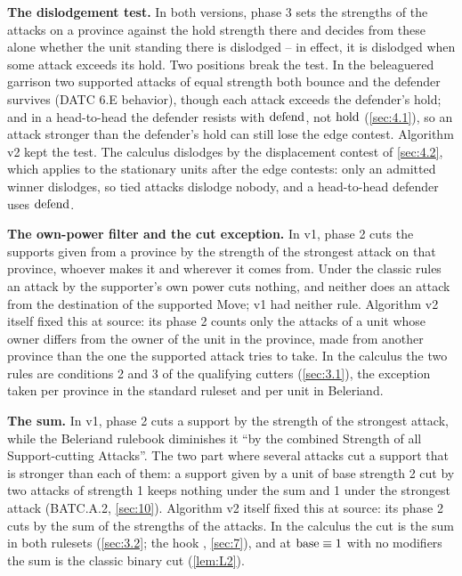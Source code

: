 \documentclass[12pt,a4paper]{article}
\begin{document}
 \textbf{The dislodgement test.}
In both versions, phase 3 sets the strengths of the attacks on a province against the hold strength there and decides from these alone whether the unit standing there is dislodged -- in effect, it is dislodged when some attack exceeds its hold.
Two positions break the test.
In the beleaguered garrison two supported attacks of equal strength both bounce and the defender survives (DATC 6.E behavior), though each attack exceeds the defender's hold; and in a head-to-head the defender resists with $\operatorname{defend}$, not $\operatorname{hold}$ (\cref{sec:4.1}), so an attack stronger than the defender's hold can still lose the edge contest.
Algorithm v2 kept the test.
The calculus dislodges by the displacement contest of \cref{sec:4.2}, which  applies to the stationary units after the edge contests: only an admitted winner dislodges, so tied attacks dislodge nobody, and a head-to-head defender uses $\operatorname{defend}$.

 \textbf{The own-power filter and the cut exception.}
In v1, phase 2 cuts the supports given from a province by the strength of the strongest attack on that province, whoever makes it and wherever it comes from.
Under the classic rules an attack by the supporter's own power cuts nothing, and neither does an attack from the destination of the supported Move; v1 had neither rule.
Algorithm v2 itself fixed this at source: its phase 2 counts only the attacks of a unit whose owner differs from the owner of the unit in the province, made from another province than the one the supported attack tries to take.
In the calculus the two rules are conditions 2 and 3 of the qualifying cutters (\cref{sec:3.1}), the exception taken per province in the standard ruleset and per unit in Beleriand.

 \textbf{The sum.}
In v1, phase 2 cuts a support by the strength of the strongest attack, while the Beleriand rulebook diminishes it ``by the combined Strength of all Support-cutting Attacks''.
The two part where several attacks cut a support that is stronger than each of them: a support given by a unit of base strength 2 cut by two attacks of strength 1 keeps nothing under the sum and 1 under the strongest attack (BATC.A.2, \cref{sec:10}).
Algorithm v2 itself fixed this at source: its phase 2 cuts by the sum of the strengths of the attacks.
In the calculus the cut is the sum in both rulesets (\cref{sec:3.2}; the hook , \cref{sec:7}), and at $\operatorname{base} \equiv 1$ with no modifiers the sum is the classic binary cut (\cref{lem:L2}).
\end{document}
